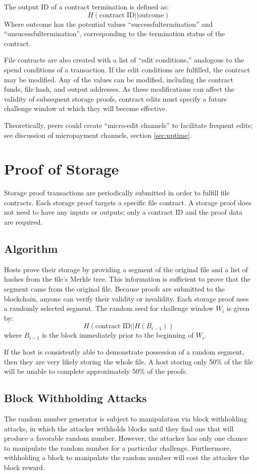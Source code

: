 \documentclass[twocolumn]{article}
\begin{document}
The output ID of a contract termination is defined as:
\[
	H(\text{contract ID} || \text{outcome})
\]
Where outcome has the potential values ``successfultermination'' and ``unsucessfultermination'', corresponding to the termination status of the contract.

File contracts are also created with a list of ``edit conditions,'' analogous to the spend conditions of a transaction.
If the edit conditions are fulfilled, the contract may be modified.
Any of the values can be modified, including the contract funds, file hash, and output addresses.
As these modifications can affect the validity of subsequent storage proofs, contract edits must specify a future challenge window at which they will become effective.

Theoretically, peers could create ``micro-edit channels'' to facilitate frequent edits; see discussion of \mbox{micropayment} channels, section \ref{sec:uptime}.

\section{Proof of Storage}
\label{sec:storage}
Storage proof transactions are periodically submitted in order to fulfill file contracts.
Each storage proof targets a specific file contract.
A storage proof does not need to have any inputs or outputs; only a contract ID and the proof data are required.

\subsection{Algorithm}
Hosts prove their storage by providing a segment of the original file and a list of hashes from the file's Merkle tree.
This information is sufficient to prove that the segment came from the original file.
Because proofs are submitted to the blockchain, anyone can verify their validity or invalidity.
Each storage proof uses a randomly selected segment.
The random seed for challenge window $W_i$ is given by:
\[
	H(\text{contract ID} || H(B_{i-1}))
\]
where $B_{i-1}$ is the block immediately prior to the beginning of $W_i$.

If the host is consistently able to demonstrate possession of a random segment, then they are very likely storing the whole file.
A host storing only 50\% of the file will be unable to complete approximately 50\% of the proofs.

\subsection{Block Withholding Attacks}
The random number generator is subject to manipulation via block withholding attacks, in which the attacker withholds blocks until they find one that will produce a favorable random number.
However, the attacker has only one chance to manipulate the random number for a particular challenge.
Furthermore, withholding a block to manipulate the random number will cost the attacker the block reward.
\end{document}
